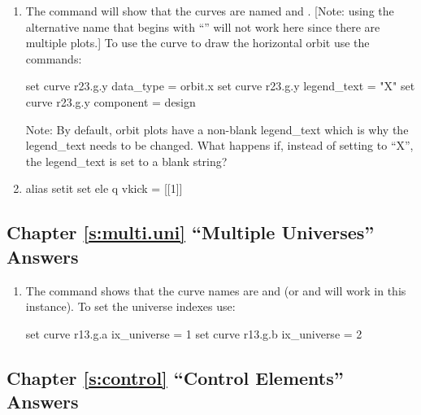 \documentclass{hitec}     %
\begin{document}
\begin{enumerate}[label=\ref*{s:three.lat}.\arabic{enumi}]
\item
The  command will show that the curves are named  and
. [Note: using the alternative name that begins with ``'' will not work here
since there are multiple  plots.] To use the  curve to draw the 
horizontal orbit use the commands:
\begin{code}
set curve r23.g.y data_type = orbit.x
set curve r23.g.y legend_text = "X"
set curve r23.g.y component = design
\end{code}
Note: By default, orbit plots have a non-blank legend_text which is why the legend_text needs to be changed.
What happens if, instead of setting to ``X'', the legend_text is set to a blank string?
%
\item
\begin{code}
alias setit set ele q vkick = [[1]]
\end{code}
\end{enumerate}

\subsection[Chapter \ref*{s:multi.uni.ex} ``Multiple Universes'']{Chapter \hyperref[s:multi.uni.ex]{\ref*{s:multi.uni}} ``Multiple Universes'' Answers}
\label{s:ans.uni}

\begin{enumerate}[label=\ref*{s:multi.uni}.\arabic{enumi}]
\item
The  command shows that the curve names are  and  (or
 and  will work in this instance). To set the universe indexes use:
\begin{code}
set curve r13.g.a ix_universe = 1
set curve r13.g.b ix_universe = 2
\end{code}
\end{enumerate}

\subsection[Chapter \ref*{s:control.ex} ``Control Elements'']{Chapter \hyperref[s:control.ex]{\ref*{s:control}} ``Control Elements'' Answers}
\label{s:ans.control}
\end{document}
